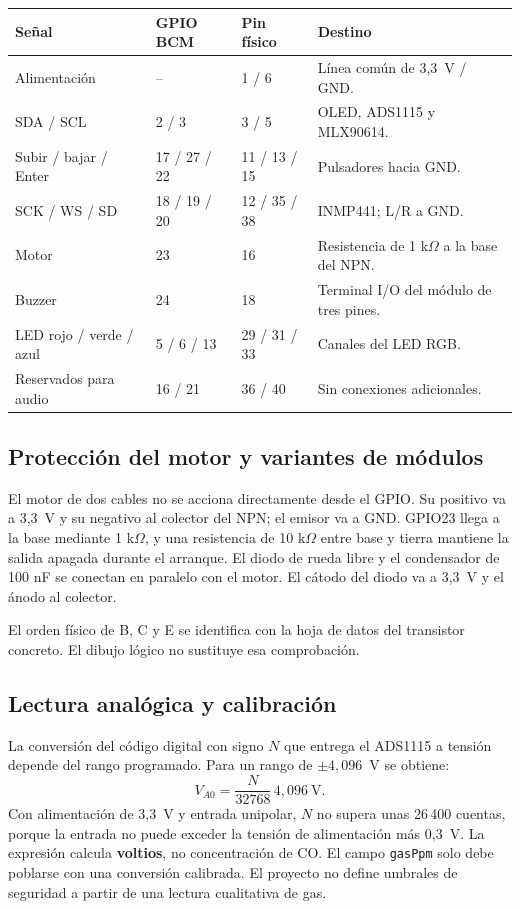 \documentclass[10pt,a4paper]{article}
\newcommand{\code}[1]{{\small\urlstyle{tt}\nolinkurl{#1}}}
\begin{document}
\label{tab:conexiones}
\begin{tabularx}{\linewidth}{@{}P{34mm}P{28mm}P{28mm}Y@{}}
\toprule\textbf{Señal} & \textbf{GPIO BCM} & \textbf{Pin físico} & \textbf{Destino}\\\midrule
Alimentación & -- & 1 / 6 & Línea común de 3,3~V / GND.\\
SDA / SCL & 2 / 3 & 3 / 5 & OLED, ADS1115 y MLX90614.\\
Subir / bajar / Enter & 17 / 27 / 22 & 11 / 13 / 15 & Pulsadores hacia GND.\\
SCK / WS / SD & 18 / 19 / 20 & 12 / 35 / 38 & INMP441; L/R a GND.\\
Motor & 23 & 16 & Resistencia de 1 k$\Omega$ a la base del NPN.\\
Buzzer & 24 & 18 & Terminal I/O del módulo de tres pines.\\
LED rojo / verde / azul & 5 / 6 / 13 & 29 / 31 / 33 & Canales del LED RGB.\\
Reservados para audio & 16 / 21 & 36 / 40 & Sin conexiones adicionales.\\\bottomrule
\end{tabularx}

\subsection{Protección del motor y variantes de módulos}
\label{sec:motor}
El motor de dos cables no se acciona directamente desde el GPIO. Su positivo va a 3,3~V y su negativo al colector del NPN; el emisor va a GND. GPIO23 llega a la base mediante 1 k$\Omega$, y una resistencia de 10 k$\Omega$ entre base y tierra mantiene la salida apagada durante el arranque. El diodo de rueda libre y el condensador de 100 nF se conectan en paralelo con el motor. El cátodo del diodo va a 3,3~V y el ánodo al colector.

El orden físico de B, C y E se identifica con la hoja de datos del transistor concreto. El dibujo lógico no sustituye esa comprobación.

\subsection{Lectura analógica y calibración}
\label{sec:analogica}
La conversión del código digital con signo $N$ que entrega el ADS1115 a tensión depende del rango programado. Para un rango de $\pm4{,}096$~V se obtiene:
\[
V_{A0}=\frac{N}{32768}\,4{,}096\ \mathrm{V}.
\]
Con alimentación de 3,3~V y entrada unipolar, $N$ no supera unas 26\,400 cuentas, porque la entrada no puede exceder la tensión de alimentación más 0,3~V. La expresión calcula \textbf{voltios}, no concentración de CO. El campo \code{gasPpm} solo debe poblarse con una conversión calibrada. El proyecto no define umbrales de seguridad a partir de una lectura cualitativa de gas.
\end{document}
